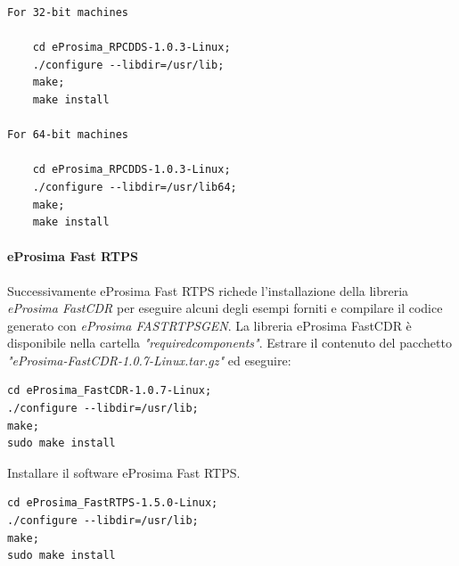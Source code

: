 \documentclass[a4paper]{article}
\begin{document}
\begin{verbatim}
For 32-bit machines

    cd eProsima_RPCDDS-1.0.3-Linux;
    ./configure --libdir=/usr/lib;
    make;
    make install

For 64-bit machines

    cd eProsima_RPCDDS-1.0.3-Linux;
    ./configure --libdir=/usr/lib64;
    make;
    make install
\end{verbatim}

\paragraph{eProsima Fast RTPS}
Successivamente eProsima Fast RTPS richede l'installazione della libreria \textit{eProsima FastCDR} per eseguire alcuni degli esempi forniti e compilare il codice generato con \textit{eProsima FASTRTPSGEN}.
La libreria eProsima FastCDR è disponibile nella cartella \textit{"requiredcomponents"}. Estrare il contenuto del pacchetto \textit{"eProsima-FastCDR-1.0.7-Linux.tar.gz"} ed eseguire:
\begin{verbatim}
cd eProsima_FastCDR-1.0.7-Linux;
./configure --libdir=/usr/lib;
make;
sudo make install
\end{verbatim}
Installare il software eProsima Fast RTPS.
\begin{verbatim}
cd eProsima_FastRTPS-1.5.0-Linux;
./configure --libdir=/usr/lib;
make;
sudo make install

\end{verbatim}
\end{document}
